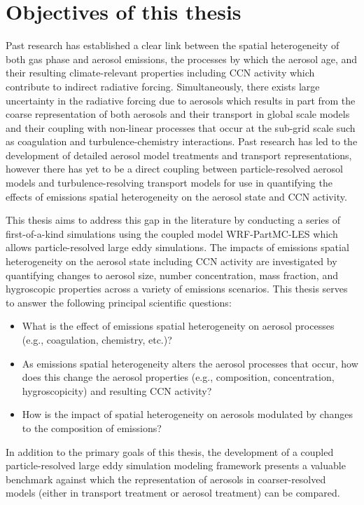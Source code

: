 \section{Objectives of this thesis}

Past research has established a clear link between the spatial heterogeneity of both gas phase and aerosol emissions, the processes by which the aerosol age, and their resulting climate-relevant properties including CCN activity which contribute to indirect radiative forcing. Simultaneously, there exists large uncertainty in the radiative forcing due to aerosols which results in part from the coarse representation of both aerosols and their transport in global scale models and their coupling with non-linear processes that occur at the sub-grid scale such as coagulation and turbulence-chemistry interactions. Past research has led to the development of detailed aerosol model treatments and transport representations, however there has yet to be a direct coupling between particle-resolved aerosol models and turbulence-resolving transport models for use in quantifying the effects of emissions spatial heterogeneity on the aerosol state and CCN activity. 

This thesis aims to address this gap in the literature by conducting a series of first-of-a-kind simulations using the coupled model WRF-PartMC-LES which allows particle-resolved large eddy simulations. The impacts of emissions spatial heterogeneity on the aerosol state including CCN activity are investigated by quantifying changes to aerosol size, number concentration, mass fraction, and hygroscopic properties across a variety of emissions scenarios. This thesis serves to answer the following principal scientific questions:
\begin{itemize}
\item What is the effect of emissions spatial heterogeneity on aerosol processes (e.g., coagulation, chemistry, etc.)?
\item As emissions spatial heterogeneity alters the aerosol processes that occur, how does this change the aerosol properties (e.g., composition, concentration, hygroscopicity) and resulting CCN activity? 
\item How is the impact of spatial heterogeneity on aerosols modulated by changes to the composition of emissions?
\end{itemize}

In addition to the primary goals of this thesis, the development of a coupled particle-resolved large eddy simulation modeling framework presents a valuable benchmark against which the representation of aerosols in coarser-resolved models (either in transport treatment or aerosol treatment) can be compared.

